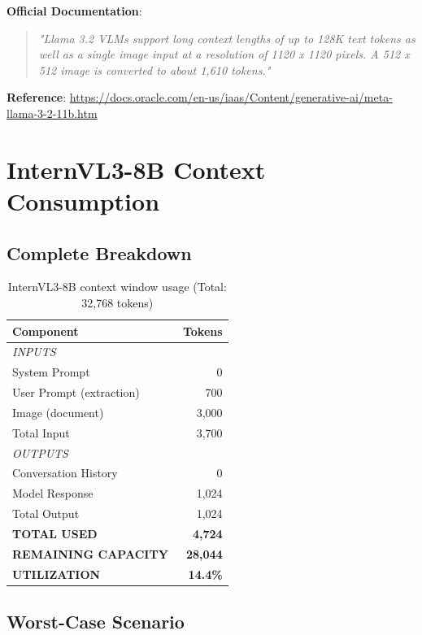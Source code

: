 \documentclass[11pt,a4paper]{article}
\begin{document}
\textbf{Official Documentation}:
\begin{quote}
\textit{"Llama 3.2 VLMs support long context lengths of up to 128K text tokens as well as a single image input at a resolution of 1120 x 1120 pixels. A 512 x 512 image is converted to about 1,610 tokens."}
\end{quote}

\textbf{Reference}: \url{https://docs.oracle.com/en-us/iaas/Content/generative-ai/meta-llama-3-2-11b.htm}

\section{InternVL3-8B Context Consumption}

\subsection{Complete Breakdown}

\begin{table}[h]
\centering
\begin{tabular}{lr}
\toprule
\textbf{Component} & \textbf{Tokens} \\
\midrule
\multicolumn{2}{l}{\textit{INPUTS}} \\
System Prompt & 0 \\
User Prompt (extraction) & ~700 \\
Image (document) & ~3,000 \\
\midrule
Total Input & ~3,700 \\
\midrule
\multicolumn{2}{l}{\textit{OUTPUTS}} \\
Conversation History & 0 \\
Model Response & 1,024 \\
\midrule
Total Output & 1,024 \\
\midrule
\textbf{TOTAL USED} & \textbf{~4,724} \\
\textbf{REMAINING CAPACITY} & \textbf{~28,044} \\
\midrule
\textbf{UTILIZATION} & \textbf{14.4\%} \\
\bottomrule
\end{tabular}
\caption{InternVL3-8B context window usage (Total: 32,768 tokens)}
\end{table}

\subsection{Worst-Case Scenario}
\end{document}
